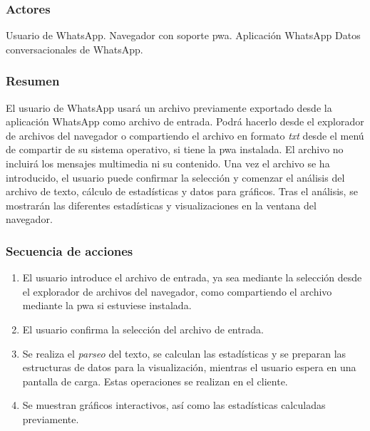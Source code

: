 \subsubsection{Actores}

Usuario de WhatsApp.
Navegador con soporte \acrfull{pwa}.
Aplicación WhatsApp
Datos conversacionales de WhatsApp.

\subsubsection{Resumen} El usuario de WhatsApp usará un archivo previamente exportado desde la aplicación WhatsApp como archivo de entrada. Podrá hacerlo desde el explorador de archivos del navegador o compartiendo el archivo en formato \textit{txt} desde el menú de compartir de su sistema operativo, si tiene la \acrfull{pwa} instalada. El archivo no incluirá los mensajes multimedia ni su contenido. Una vez el archivo se ha introducido, el usuario puede confirmar la selección y comenzar el análisis del archivo de texto, cálculo de estadísticas y datos para gráficos. Tras el análisis, se mostrarán las diferentes estadísticas y visualizaciones en la ventana del navegador.

\subsubsection{Secuencia de acciones}

\begin{enumerate}
	\item El usuario introduce el archivo de entrada, ya sea mediante la selección desde el explorador de archivos del navegador, como compartiendo el archivo mediante la \acrshort{pwa} si estuviese instalada.
	\item El usuario confirma la selección del archivo de entrada.
	\item Se realiza el \textit{parseo} del texto, se calculan las estadísticas y se preparan las estructuras de datos para la visualización, mientras el usuario espera en una pantalla de carga. Estas operaciones se realizan en el cliente.
	\item Se muestran gráficos interactivos, así como las estadísticas calculadas previamente.
\end{enumerate}

